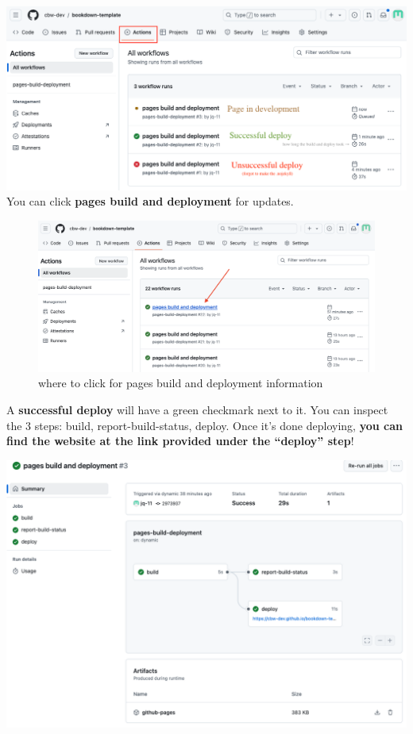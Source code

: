 \documentclass[
]{book}
\theoremstyle{definition}
\theoremstyle{definition}
\theoremstyle{definition}
\theoremstyle{definition}
\theoremstyle{remark}
\begin{document}
\includegraphics{img/git-instruct/github-pages-actions-explained.png}\\

You can click \textbf{pages build and deployment} for updates.

\begin{figure}
\centering
\includegraphics{img/git-instruct/pages-build-and-deployment.png}
\caption{where to click for pages build and deployment information}
\end{figure}

A \textbf{successful deploy} will have a green checkmark next to it. You can inspect the 3 steps: build, report-build-status, deploy. Once it's done deploying, \textbf{you can find the website at the link provided under the ``deploy'' step}!

\includegraphics{img/git-instruct/successful-deploy.png}\\
\end{document}
